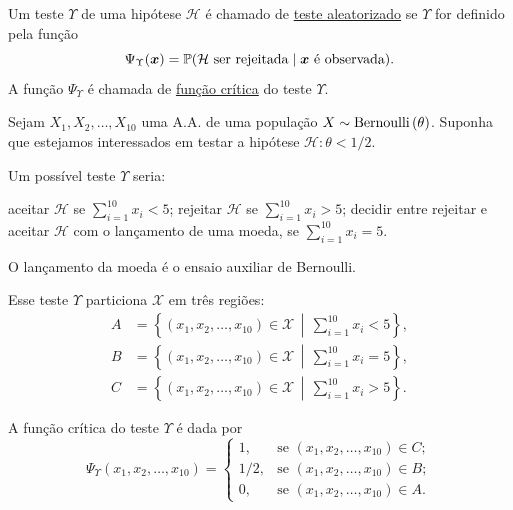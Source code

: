 \begin{definition}
Um teste $\Upsilon$ de uma hipótese $\mathcal{H}$ é chamado de \uline{teste aleatorizado} se $\Upsilon$ for definido pela função
\begin{equation}
\Psi_\Upsilon(\bm{x})=\mathbb{P}(\mathcal{H}\text{ ser rejeitada}\mid\bm{x}\text{ é observada}).
\end{equation}
A função $\Psi_\Upsilon$ é chamada de \uline{função crítica} do teste $\Upsilon$.
\end{definition}

\begin{example}
Sejam $X_1,X_2,\ldots,X_{10}$ uma A.A. de uma população $X\sim\operatorname{Bernoulli}\left(\theta\right)$. Suponha que estejamos interessados em testar a hipótese $\mathcal{H}:\theta<1/2$.

Um possível teste $\Upsilon$ seria:
\begin{outline}
\1 aceitar $\mathcal{H}$ se $\sum_{i=1}^{10}x_i<5$;
\1 rejeitar $\mathcal{H}$ se $\sum_{i=1}^{10}x_i>5$;
\1 decidir entre rejeitar e aceitar $\mathcal{H}$ com o lançamento de uma moeda, se $\sum_{i=1}^{10}x_i=5$.
\end{outline}
O lançamento da moeda é o ensaio auxiliar de Bernoulli.

Esse teste $\Upsilon$ particiona $\mathcal{X}$ em três regiões:
\begin{align}
A &= \left\{(x_1,x_2,\ldots,x_{10})\in\mathcal{X}\,\middle|\,\sum_{i=1}^{10}x_i<5\right\},\\
B &= \left\{(x_1,x_2,\ldots,x_{10})\in\mathcal{X}\,\middle|\,\sum_{i=1}^{10}x_i=5\right\},\\
C &= \left\{(x_1,x_2,\ldots,x_{10})\in\mathcal{X}\,\middle|\,\sum_{i=1}^{10}x_i>5\right\}.
\end{align}

A função crítica do teste $\Upsilon$ é dada por
\begin{equation}
\Psi_\Upsilon(x_1,x_2,\ldots,x_{10})=
\begin{cases}
1, & \text{se }(x_1,x_2,\ldots,x_{10})\in C;\\
1/2, & \text{se }(x_1,x_2,\ldots,x_{10})\in B;\\
0, & \text{se }(x_1,x_2,\ldots,x_{10})\in A.
\end{cases}
\end{equation}
\end{example}

